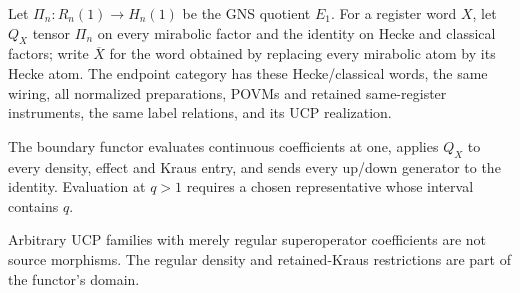 \begin{definition}
Let $\Pi_n:R_n(1)\to H_n(1)$ be the GNS quotient $E_1$.  For a register word
$X$, let $Q_X$ tensor $\Pi_n$ on every mirabolic factor and the identity on
Hecke and classical factors; write $\overline X$ for the word obtained by
replacing every mirabolic atom by its Hecke atom.  The endpoint category has
these Hecke/classical words, the same wiring, all normalized preparations,
POVMs and retained same-register instruments, the same label relations, and
its UCP realization.

The boundary functor evaluates continuous coefficients at one, applies $Q_X$
to every density, effect and Kraus entry, and sends every up/down generator
to the identity.  Evaluation at $q>1$ requires a chosen representative whose
interval contains $q$.
\end{definition}
\begin{scope}
Arbitrary UCP families with merely regular superoperator coefficients are not
source morphisms.  The regular density and retained-Kraus restrictions are
part of the functor's domain.
\end{scope}

